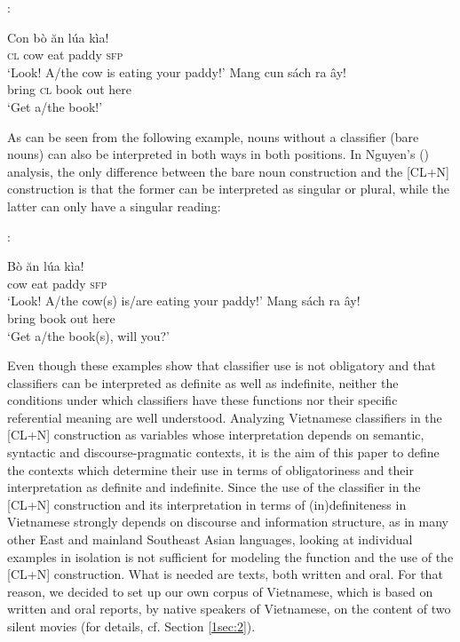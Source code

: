 \documentclass[output=paper]{langsci/langscibook}
\begin{document}
\begin{exe}
\ex\label{1ex:nguyen}
\citet{nguyen:04}:
	\begin{xlista}
	\ex\label{1ex:nguyen.a}
	\gll Con b\`o \u{a}n l\'ua k\`ia!\\
  	{\textsc{cl}} cow eat paddy {\textsc{sfp}}\\
   	\glt `Look! A/the cow is eating your paddy!'
	\ex\label{1ex:nguyen.b}
	\gll Mang cu{\dao}n s\'ach ra \textcrd\^ay!\\
	bring {\textsc{cl}} book out here\\
   	\glt `Get a/the book!'
	\end{xlista}
\end{exe}

As can be seen from the following example, nouns without a classifier (bare nouns) can also be interpreted in both ways in both positions. In Nguyen's (\citeyear{nguyen:04}) analysis, the only difference between the bare noun construction and the [CL+N] construction is that the former can be interpreted as singular or plural, while the latter can only have a singular reading:

\begin{exe}
\ex\label{1ex:nguyen2}
\citet{nguyen:04}:
	\begin{xlista}
	\ex
	\gll B\`o \u{a}n l\'ua k\`ia!\\
   	cow eat paddy {\textsc{sfp}}\\
   	\glt `Look! A/the cow(s) is/are eating your paddy!'
	\ex
	\gll Mang s\'ach ra \textcrd\^ay!\\
	bring book out here\\
   	\glt `Get a/the book(s), will you?'
	\end{xlista}
\end{exe}

Even though these examples show that classifier use is not obligatory and that classifiers can be interpreted as definite as well as indefinite, neither the conditions under which classifiers have these functions nor their specific referential meaning are well understood. Analyzing Vietnamese classifiers in the [CL+N] construction as variables whose interpretation depends on semantic, syntactic and discourse-pragmatic contexts, it is the aim of this paper to define the contexts which determine their use in terms of obligatoriness and their interpretation as definite and indefinite. Since the use of the classifier in the [CL+N] construction and its interpretation in terms of (in)definiteness in Vietnamese strongly depends on discourse and information structure, as in many other East  and mainland Southeast Asian languages, looking at individual examples in isolation is not sufficient for modeling the function and the use of the [CL+N] construction. What is needed are texts, both written and oral. For that reason, we decided to set up our own corpus of Vietnamese, which is based on written and oral reports, by native speakers of Vietnamese, on the content of two silent movies (for details, cf. Section \ref{1sec:2}).
\end{document}
